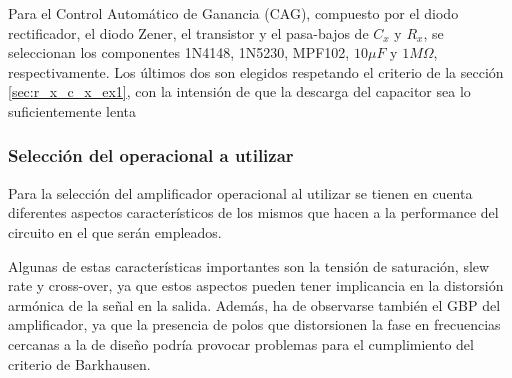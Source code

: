 Para el Control Automático de Ganancia (CAG), compuesto por el diodo rectificador, el diodo Zener, el transistor y el pasa-bajos de $C_x$ y $R_x$, 
se seleccionan los componentes 1N4148, 1N5230, MPF102, $10\mu F$ y $1M\Omega$, respectivamente.
Los últimos dos son elegidos respetando el criterio de la sección \ref{sec:r_x_c_x_ex1}, con la intensión de que la descarga del capacitor sea lo 
suficientemente lenta


\subsubsection{Selección del operacional a utilizar}
Para la selección del amplificador operacional al utilizar se tienen en cuenta diferentes aspectos característicos de los mismos que hacen a la 
performance del circuito en el que serán empleados.

Algunas de estas características importantes son la tensión de saturación, slew rate y cross-over, ya que estos aspectos pueden tener implicancia en la 
distorsión armónica de la señal en la salida.
Además, ha de observarse también el GBP del amplificador, ya que la presencia de polos que distorsionen la fase en frecuencias cercanas a la de diseño 
podría provocar problemas para el cumplimiento del criterio de Barkhausen.

